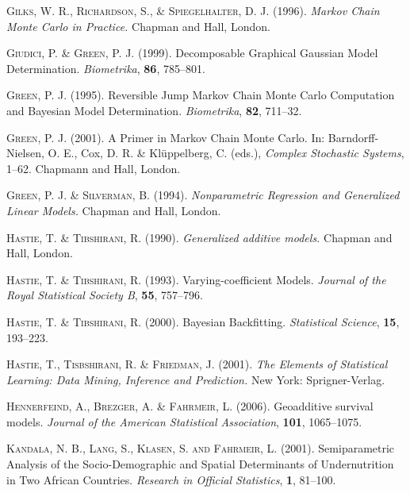\begin{thebibliography}{99}
 {\scshape Gilks, W. R., Richardson, S., \& Spiegelhalter, D. J.} (1996).
 {\it Markov Chain Monte Carlo in Practice.}
 Chapman and Hall, London.

 {\scshape Giudici, P. \& Green, P. J.} (1999).
 Decomposable Graphical Gaussian Model Determination.
 {\it Biometrika}, {\bf 86}, 785--801.

 {\scshape Green, P. J.} (1995).
 Reversible Jump Markov Chain Monte Carlo Computation and Bayesian Model Determination.
 {\it Biometrika}, {\bf  82}, 711--32.

 {\scshape Green, P. J.} (2001).
 A Primer in Markov Chain Monte Carlo.
 In: Barndorff-Nielsen, O. E., Cox, D. R. \& Kl\"{u}ppelberg, C. (eds.),
 {\it Complex Stochastic Systems}, 1--62.
 Chapmann and Hall, London.

 {\scshape Green, P. J. \& Silverman, B.} (1994).
 {\it Nonparametric Regression and Generalized Linear Models.}
 Chapman and Hall, London.

 {\scshape Hastie, T. \& Tibshirani, R.} (1990).
 {\it Generalized additive models.}
 Chapman and Hall, London.

 {\scshape Hastie, T. \& Tibshirani, R.} (1993).
 Varying-coefficient Models.
 {\it Journal of the Royal Statistical Society B}, {\bf 55}, 757--796.

 {\scshape Hastie, T. \& Tibshirani, R.} (2000).
 Bayesian Backfitting.
 {\it Statistical Science}, {\bf 15}, 193--223.

 {\scshape Hastie, T., Tisbshirani, R. \& Friedman, J.} (2001).
 {\it The Elements of Statistical Learning: Data Mining, Inference and Prediction.}
 New York: Sprigner-Verlag.

 {\scshape Hennerfeind, A., Brezger, A. \& Fahrmeir, L.} (2006).
 Geoadditive survival models.
 {\it Journal of the American Statistical Association}, {\bf 101}, 1065--1075.

 {\scshape Kandala, N. B., Lang, S., Klasen, S. and Fahrmeir, L.} (2001).
 Semiparametric Analysis of the Socio-Demographic and Spatial Determinants of Undernutrition in Two African Countries.
 {\it Research in Official Statistics}, {\bf 1}, 81--100.


\end{thebibliography}

